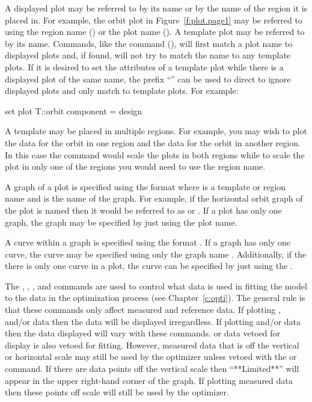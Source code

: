 A displayed plot may be referred to by its name or by the name of the region it is placed in. For
example, the orbit plot in Figure~\ref{f:plot.page1} may be referred to using the region name
() or the plot name (). A template plot may be referred to by its name. Commands,
like the  command (), will first match a plot name to displayed plots
and, if found, will not try to match the name to any template plots. If it is desired to set the
attributes of a template plot while there is a displayed plot of the same name, the prefix
``'' can be used to direct \tao to ignore displayed plots and only match to template plots.
For example:
\begin{example}
  set plot T::orbit component = design
\end{example}

A template may be placed in multiple regions.  For example, you may wish to plot the  data
for the orbit in one region and the  data for the orbit in another region. In this case
the command  would scale the plots in both regions while to scale the plot in only
one of the regions you would need to use the region name.

A graph of a plot is specified using the format  where
 is a template or region name and  is the name of the
graph. For example, if the horizontal orbit graph of the  plot is named 
then it would be referred to as  or . If a plot has only one graph,
the graph may be specified by just using the plot name.

A curve within a graph is specified using the format
. If a graph has only one curve, the curve may be
specified using only the graph name . Additionally, if the there
is only one curve in a plot, the curve can be specified by just using the .

The , , , and  commands are used to control what
data is used in fitting the model to the data in the optimization process (see
Chapter~\ref{c:opti}). The general rule is that these commands only affect measured and
reference data. If plotting ,  and/or  data then the data
will be displayed irregardless. If plotting  and/or  data then the data
displayed will vary with these commands.   or  data vetoed for display is
also vetoed for fitting.  However, measured data that is off the vertical or horizontal
scale may still be used by the optimizer unless vetoed with the  or 
command.  If there are data points off the vertical scale then ``**Limited**'' will appear
in the upper right-hand corner of the graph. If plotting measured data then these points
off scale will still be used by the optimizer.

